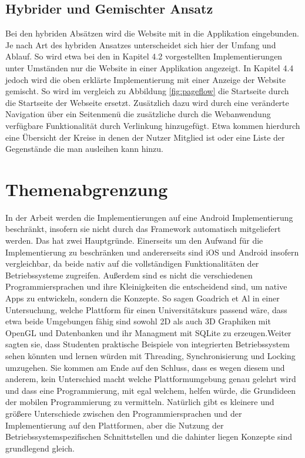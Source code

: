 \subsection{Hybrider und Gemischter Ansatz}
Bei den hybriden Absätzen wird die Website mit in die Applikation eingebunden. Je nach Art des hybriden Ansatzes unterscheidet sich hier der Umfang und Ablauf. So wird etwa bei den in Kapitel 4.2 vorgestellten Implementierungen unter Umständen nur die Website in einer Applikation angezeigt. In Kapitel 4.4 jedoch wird die oben erklärte Implementierung mit einer Anzeige der Website gemischt. So wird im vergleich zu Abbildung \ref{fig:pageflow} die Startseite durch die Startseite der Webseite ersetzt. Zusätzlich dazu wird durch eine veränderte Navigation über ein Seitenmenü die zusätzliche durch die Webanwendung verfügbare Funktionalität durch Verlinkung hinzugefügt. Etwa kommen hierdurch eine Übersicht der Kreise in denen der Nutzer Mitglied ist oder eine Liste der Gegenstände die man ausleihen kann hinzu.

\section{Themenabgrenzung}
In der Arbeit werden die Implementierungen auf eine Android Implementierung beschränkt, insofern sie nicht durch das Framework automatisch mitgeliefert werden. Das hat zwei Hauptgründe. Einerseits um den Aufwand für die Implementierung zu beschränken und andererseits sind iOS und Android insofern vergleichbar, da beide nativ auf die vollständigen Funktionalitäten der Betriebssysteme zugreifen. Außerdem sind es nicht die verschiedenen Programmiersprachen und ihre Kleinigkeiten die entscheidend sind, um native Apps zu entwickeln, sondern die Konzepte. So sagen Goadrich et Al in einer Untersuchung, welche Plattform für einen Universitätskurs passend wäre, dass etwa beide Umgebungen fähig sind sowohl 2D als auch 3D Graphiken mit OpenGL und Datenbanken und ihr Managment mit SQLite zu erzeugen.\cite{iOSvsAndroid}Weiter sagten sie, dass Studenten praktische Beispiele von integrierten Betriebssystem sehen könnten und lernen würden mit Threading, Synchronisierung und Locking umzugehen\cite{iOSvsAndroid}. Sie kommen am Ende auf den Schluss, dass es wegen diesem und anderem, kein Unterschied macht welche Plattformumgebung genau gelehrt wird und dass eine Programmierung, mit egal welchem, helfen würde, die Grundideen der mobilen Programmierung zu vermitteln. \cite{iOSvsAndroid}
Natürlich gibt es kleinere und größere Unterschiede zwischen den Programmiersprachen und der Implementierung auf den Plattformen, aber die Nutzung der Betriebssystemspezifischen Schnittstellen und die dahinter liegen Konzepte sind grundlegend gleich.

